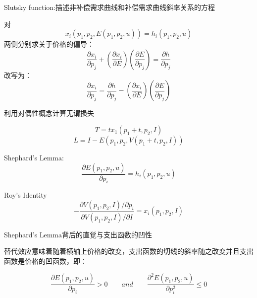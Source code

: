 \documentclass{article}
\begin{document}
\hspace*{\fill}

Slutsky function:描述非补偿需求曲线和补偿需求曲线斜率关系的方程

对
\[
x_i(p_1,p_2,E(p_1,p_2,u))=h_i(p_1,p_2,u)
\]
两侧分别求关于价格的偏导：
\[
\frac{\partial x_i}{\partial p_j}+(\frac{\partial x_i}{\partial E})(\frac{\partial E}{\partial p_j})=\frac{\partial h}{\partial p_j}
\]
改写为：
\[
\frac{\partial x_i}{\partial p_j}=\frac{\partial h}{\partial p_j}-(\frac{\partial x_i}{\partial E})(\frac{\partial E}{\partial p_j})
\]

利用对偶性概念计算无谓损失

\[
T=tx_1(p_1+t,p_2,I)
\]
\[
L=I-E(p_1,p_2,V(p_1+t,p_2,I))
\]

Shephard's Lemma:
\[
\frac{\partial E(p_1,p_2,u)}{\partial p_i}=h_i(p_1,p_2,u)
\]

Roy's Identity
\[
-\frac{\partial V(p_1,p_2,I)/\partial p_i}{\partial V(p_1,p_2,I)/\partial I}=x_i(p_1,p_2,I)
\]

\hspace*{\fill}

Shephard's Lemma背后的直觉与支出函数的凹性

替代效应意味着随着横轴上价格的改变，支出函数的切线的斜率随之改变并且支出函数是价格的凹函数，即：

\[
\frac{\partial E(p_1,p_2,u)}{\partial p_i}>0\qquad and\qquad \frac{\partial^2E(p_1,p_2,u)}{\partial p_i^2}\le 0
\]
\end{document}
